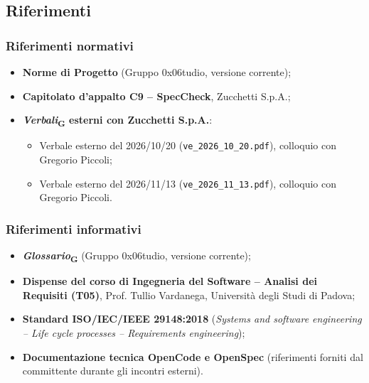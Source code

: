 \documentclass[11pt, a4paper]{article}
\newcommand{\glossario}[1]{\textit{#1}\textsubscript{G}}
\begin{document}
\subsection{Riferimenti}

\subsubsection{Riferimenti normativi}
\begin{itemize}
    \item \textbf{Norme di Progetto} (Gruppo 0x06tudio, versione corrente);
    \item \textbf{Capitolato d'appalto C9 -- SpecCheck}, Zucchetti S.p.A.;
    \item \textbf{\glossario{Verbali} esterni con Zucchetti S.p.A.}:
    \begin{itemize}
        \item Verbale esterno del 2026/10/20 (\texttt{ve\_2026\_10\_20.pdf}), colloquio con Gregorio Piccoli;
        \item Verbale esterno del 2026/11/13 (\texttt{ve\_2026\_11\_13.pdf}), colloquio con Gregorio Piccoli.
    \end{itemize}
\end{itemize}

\subsubsection{Riferimenti informativi}
\begin{itemize}
    \item \textbf{\glossario{Glossario}} (Gruppo 0x06tudio, versione corrente);
    \item \textbf{Dispense del corso di Ingegneria del Software -- Analisi dei Requisiti (T05)}, Prof. Tullio Vardanega, Università degli Studi di Padova;
    \item \textbf{Standard ISO/IEC/IEEE 29148:2018} (\textit{Systems and software engineering -- Life cycle processes -- Requirements engineering});
    \item \textbf{Documentazione tecnica OpenCode e OpenSpec} (riferimenti forniti dal committente durante gli incontri esterni).
\end{itemize}

\newpage

\end{document}
